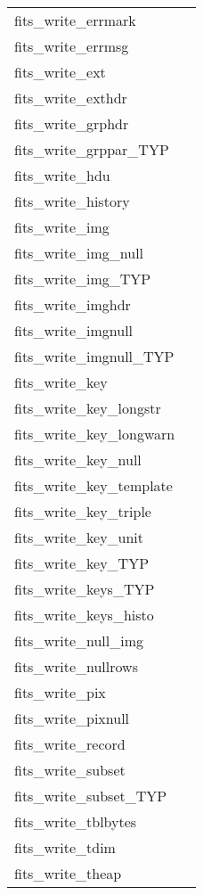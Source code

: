 \documentclass[11pt]{book}
\begin{document}
\begin{tabular}{lr}
fits\_write\_errmark   & \pageref{ffpmrk} \\
fits\_write\_errmsg   & \pageref{ffpmsg} \\
fits\_write\_ext        & \pageref{ffgextn} \\
fits\_write\_exthdr        & \pageref{ffphps} \\
fits\_write\_grphdr       & \pageref{ffphpr} \\
fits\_write\_grppar\_TYP & \pageref{ffpgpx} \\
fits\_write\_hdu       & \pageref{ffwrhdu} \\
fits\_write\_history      & \pageref{ffphis} \\
fits\_write\_img        & \pageref{ffppr} \\
fits\_write\_img\_null & \pageref{ffppru} \\
fits\_write\_img\_TYP    & \pageref{ffpprx} \\
fits\_write\_imghdr       & \pageref{ffphps} \\
fits\_write\_imgnull     & \pageref{ffppn} \\
fits\_write\_imgnull\_TYP & \pageref{ffppnx} \\
fits\_write\_key          & \pageref{ffpky} \\
fits\_write\_key\_longstr  & \pageref{ffpkls} \\
fits\_write\_key\_longwarn & \pageref{ffplsw} \\
fits\_write\_key\_null     & \pageref{ffpkyu} \\
fits\_write\_key\_template & \pageref{ffpktp} \\
fits\_write\_key\_triple   & \pageref{ffpkyt} \\
fits\_write\_key\_unit     & \pageref{ffpunt} \\
fits\_write\_key\_TYP      & \pageref{ffpkyx} \\
fits\_write\_keys\_TYP     & \pageref{ffpknx} \\
fits\_write\_keys\_histo   & \pageref{writekeyshisto} \\
fits\_write\_null\_img    & \pageref{ffpprn} \\
fits\_write\_nullrows      & \pageref{ffpclu} \\
fits\_write\_pix          & \pageref{ffppx} \\
fits\_write\_pixnull      & \pageref{ffppxn} \\
fits\_write\_record       & \pageref{ffprec} \\
fits\_write\_subset       & \pageref{ffpss} \\
fits\_write\_subset\_TYP  & \pageref{ffpssx} \\
fits\_write\_tblbytes  & \pageref{ffptbb} \\
fits\_write\_tdim         & \pageref{ffptdm} \\
fits\_write\_theap    & \pageref{ffpthp} \\
\end{tabular}
\end{document}
